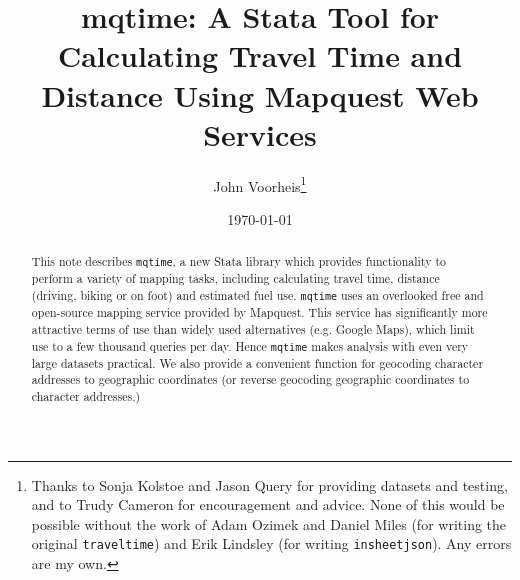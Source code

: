 \documentclass[11pt]{article}
\title{mqtime: A Stata Tool for Calculating Travel Time and Distance Using Mapquest Web Services}
\author{John Voorheis\thanks{Thanks to Sonja Kolstoe and Jason Query for providing datasets and testing, and to Trudy Cameron for encouragement and advice. None of this would be possible without the work of Adam Ozimek and Daniel Miles (for writing the original \texttt{traveltime}) and Erik Lindsley (for writing \texttt{insheetjson}). Any errors are my own.}}
\affil{University of Oregon}
\date{\today}
\begin{document}
\maketitle

\begin{abstract}
This note describes  \verb|mqtime|, a new Stata library which provides functionality to perform a variety of mapping tasks, including calculating travel time, distance (driving, biking or on foot) and estimated fuel use.  \verb|mqtime| uses an overlooked free and open-source mapping service provided by Mapquest. This service has significantly more attractive terms of use than widely used alternatives (e.g. Google Maps), which limit use to a few thousand queries per day. Hence \verb|mqtime| makes analysis with even very large datasets practical. We also provide a convenient function for geocoding character addresses to geographic coordinates (or reverse geocoding geographic coordinates to character addresses.) 
\end{abstract}

\newpage
\end{document}
